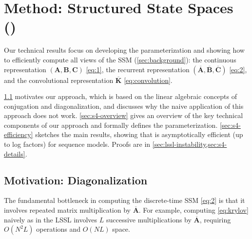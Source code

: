 
\section{Method: Structured State Spaces (\methodabbrv)}
\label{sec:s4}

Our technical results focus on developing the \methodabbrv{} parameterization and showing how to efficiently compute all views of the SSM (\cref{sec:background}):
the continuous representation \( (\bm{A}, \bm{B}, \bm{C}) \) \eqref{eq:1},
the recurrent representation \( (\bm{\overline{A}}, \bm{\overline{B}}, \bm{\overline{C}}) \) \eqref{eq:2},
and the convolutional representation \( \bm{\overline{K}} \) \eqref{eq:convolution}.


\cref{sec:s4-motivation} motivates our approach, which is based on the linear algebraic concepts of conjugation and diagonalization, and discusses why the naive application of this approach does not work.
\cref{sec:s4-overview} gives an overview of the key technical components of our approach and formally defines the \methodabbrv{} parameterization.
\cref{sec:s4-efficiency} sketches the main results, showing that \methodabbrv{} is asymptotically efficient (up to log factors) for sequence models.
Proofs are in \cref{sec:lssl-instability,sec:s4-details}.






















\subsection{Motivation: Diagonalization}
\label{sec:s4-motivation}

The fundamental bottleneck in computing the discrete-time SSM \eqref{eq:2} is that it involves repeated matrix multiplication by \( \bm{\overline{A}} \).
For example, computing \eqref{eq:krylov} naively as in the LSSL involves \( L \) successive multiplications by \( \bm{\overline{A}} \), requiring \( O(N^2 L) \) operations and \( O(NL) \) space.

